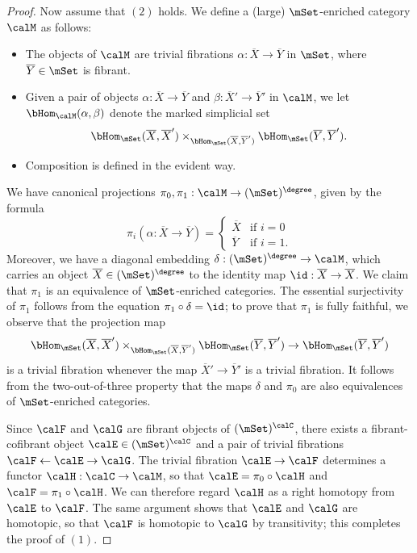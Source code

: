 \begin{proof}
Now assume that $(2)$ holds. We define a (large) $\mSet$-enriched category $\calM$ as follows:
\begin{itemize}
\item The objects of $\calM$ are trivial fibrations $\alpha: \overline{X} \rightarrow \overline{Y}$
in $\mSet$, where $\overline{Y} \in \mSet$ is fibrant.
\item Given a pair of objects $\alpha: \overline{X} \rightarrow \overline{Y}$ and
$\beta: \overline{X}' \rightarrow \overline{Y}'$ in $\calM$, we let
$\bHom_{ \calM}(\alpha, \beta)$ denote the marked simplicial set
$$ \bHom_{\mSet}( \overline{X}, \overline{X}') \times_{ \bHom_{ \mSet}( \overline{X}, \overline{Y}')} \bHom_{ \mSet}( \overline{Y}, \overline{Y}').$$
\item Composition is defined in the evident way.
\end{itemize}
We have canonical projections $\pi_0, \pi_1: \calM \rightarrow (\mSet)^{\degree}$, given by the formula
$$\pi_i ( \alpha: \overline{X} \rightarrow \overline{Y} ) = \begin{cases} \overline{X} & \text{if } i=0 \\
\overline{Y} & \text{if } i=1.\end{cases}$$
Moreover, we have a diagonal embedding $\delta: (\mSet)^{\degree} \rightarrow \calM$, which carries an object $\overline{X} \in (\mSet)^{\degree}$ to the identity map $\id: \overline{X} \rightarrow \overline{X}$. We claim that $\pi_1$ is an equivalence of $\mSet$-enriched categories. The essential surjectivity of $\pi_1$ follows from the equation $\pi_1 \circ \delta = \id$; to prove that $\pi_1$ is fully faithful, we observe that the projection map
$$ \bHom_{\mSet}( \overline{X}, \overline{X}') \times_{ \bHom_{ \mSet}( \overline{X}, \overline{Y}')} \bHom_{ \mSet}( \overline{Y}, \overline{Y}') \rightarrow \bHom_{\mSet}( \overline{Y}, \overline{Y}')$$
is a trivial fibration whenever the map $\overline{X}' \rightarrow \overline{Y}'$ is a trivial fibration.
It follows from the two-out-of-three property that the maps $\delta$ and $\pi_0$ are also equivalences of $\mSet$-enriched categories.

Since $\calF$ and $\calG$ are fibrant objects of $(\mSet)^{\calC}$, there exists a fibrant-cofibrant object $\calE \in (\mSet)^{\calC}$ and a pair of trivial fibrations
$\calF \leftarrow \calE \rightarrow \calG$. The trivial fibration $\calE \rightarrow \calF$ determines a functor $\calH:  \calC \rightarrow \calM$, so that $\calE = \pi_0 \circ \calH$ and $\calF = \pi_1 \circ \calH$. We can therefore regard $\calH$ as a right homotopy from $\calE$ to $\calF$. The same argument shows that $\calE$ and $\calG$ are homotopic, so that $\calF$ is homotopic to $\calG$ by transitivity; this completes the proof of $(1)$.
\end{proof}

